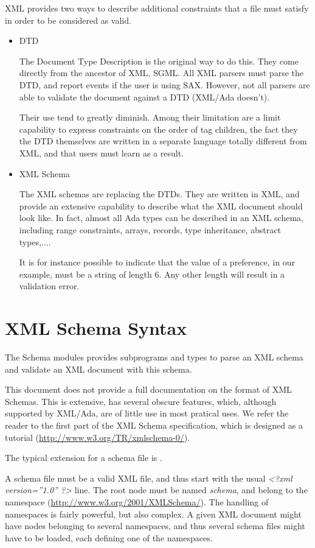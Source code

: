 \documentclass[letterpaper,10pt,english]{sphinxmanual}
\begin{document}
XML provides two ways to describe additional constraints that a file must
satisfy in order to be considered as valid.
\begin{itemize}
\item {} 
DTD

The Document Type Description is the original way to do this. They come
directly from the ancestor of XML, SGML. All XML parsers must parse the DTD,
and report events if the user is using SAX. However, not all parsers are able
to validate the document against a DTD (XML/Ada doesn't).

Their use tend to greatly diminish. Among their limitation are a limit
capability to express constraints on the order of tag children, the fact they
the DTD themselves are written in a separate language totally different from
XML, and that users must learn as a result.

\item {} 
XML Schema

The XML schemas are replacing the DTDs. They are written in XML, and provide
an extensive capability to describe what the XML document should look like.
In fact, almost all Ada types can be described in an XML schema, including
range constraints, arrays, records, type inheritance, abstract types,....

It is for instance possible to indicate that the value of a preference, in
our example, must be a string of length 6. Any other length will result in a
validation error.

\end{itemize}


\section{XML Schema Syntax}
\label{schema:xml-schema-syntax}
The Schema modules provides subprograms and types to parse an XML schema and
validate an XML document with this schema.

This document does not provide a full documentation on the format of XML
Schemas. This is extensive, has several obscure features, which, although
supported by XML/Ada, are of little use in most pratical uses. We refer the
reader to the first part of the XML Schema specification, which is designed as
a tutorial (\href{http://www.w3.org/TR/xmlschema-0/}{http://www.w3.org/TR/xmlschema-0/}).

The typical extension for a schema file is .

A schema file must be a valid XML file, and thus start with the usual \emph{\textless{}?xml
version=''1.0'' ?\textgreater{}} line. The root node must be named \emph{schema}, and belong to the
namespace (\href{http://www.w3.org/2001/XMLSchema/}{http://www.w3.org/2001/XMLSchema/}). The handling of namespaces is fairly
powerful, but also complex. A given XML document might have nodes belonging to
several namespaces, and thus several schema files might have to be loaded, each
defining one of the namespaces.
\end{document}
